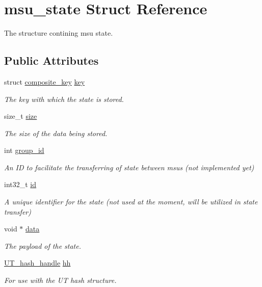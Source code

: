 \hypertarget{structmsu__state}{\section{msu\-\_\-state Struct Reference}
\label{structmsu__state}
}


The structure contining msu state.  


\subsection*{Public Attributes}
\begin{DoxyCompactItemize}
\item 
struct \hyperlink{structcomposite__key}{composite\-\_\-key} \hyperlink{structmsu__state_a847e9475d17bba6d22da32d9400be11a}{key}
\begin{DoxyCompactList}\small\item\em The key with which the state is stored. \end{DoxyCompactList}\item 
size\-\_\-t \hyperlink{structmsu__state_a6fb5d739fe1877967cb59624fa454157}{size}
\begin{DoxyCompactList}\small\item\em The size of the data being stored. \end{DoxyCompactList}\item 
int \hyperlink{structmsu__state_aced19bc311412983eef344487d088895}{group\-\_\-id}
\begin{DoxyCompactList}\small\item\em An I\-D to facilitate the transferring of state between msus (not implemented yet) \end{DoxyCompactList}\item 
int32\-\_\-t \hyperlink{structmsu__state_a9ce5b8e3cf4774a8920c01b02c54c5a1}{id}
\begin{DoxyCompactList}\small\item\em A unique identifier for the state (not used at the moment, will be utilized in state transfer) \end{DoxyCompactList}\item 
void $\ast$ \hyperlink{structmsu__state_a7c6d1548878fbcafa7f359f05303b8b3}{data}
\begin{DoxyCompactList}\small\item\em The payload of the state. \end{DoxyCompactList}\item 
\hyperlink{struct_u_t__hash__handle}{U\-T\-\_\-hash\-\_\-handle} \hyperlink{structmsu__state_a07301d57260c6fb15ee1c2f8abab45dd}{hh}
\begin{DoxyCompactList}\small\item\em For use with the U\-T hash structure. \end{DoxyCompactList}\end{DoxyCompactItemize}


